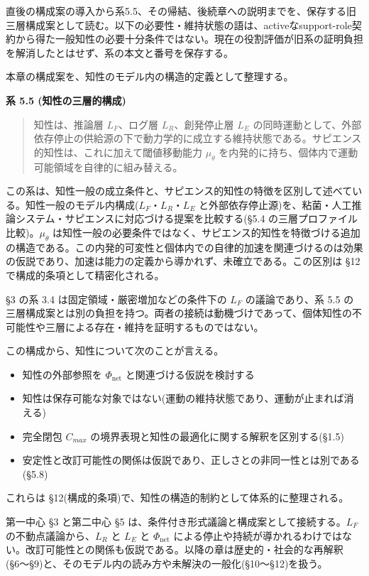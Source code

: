 直後の構成案の導入から系5.5、その帰結、後続章への説明までを、保存する旧三層構成案として読む。以下の必要性・維持状態の語は、activeなsupport-role契約から得た一般知性の必要十分条件ではない。現在の役割評価が旧系の証明負担を解消したとはせず、系の本文と番号を保存する。

本章の構成案を、知性のモデル内の構造的定義として整理する。

\textbf{系 5.5 (知性の三層的構成)}

\begin{quote}
知性は、推論層 $L_F$、ログ層 $L_R$、創発停止層 $L_E$ の同時運動として、外部依存停止の供給源の下で動力学的に成立する維持状態である。サピエンス的知性は、これに加えて閾値移動能力 $\mu_\theta$ を内発的に持ち、個体内で運動可能領域を自律的に組み替える。
\end{quote}


この系は、知性一般の成立条件と、サピエンス的知性の特徴を区別して述べている。知性一般のモデル内構成($L_F$・$L_R$・$L_E$ と外部依存停止源)を、粘菌・人工推論システム・サピエンスに対応づける提案を比較する(\S{}5.4 の三層プロファイル比較)。$\mu_\theta$ は知性一般の必要条件ではなく、サピエンス的知性を特徴づける追加の構造である。この内発的可変性と個体内での自律的加速を関連づけるのは効果の仮説であり、加速は能力の定義から導かれず、未確立である。この区別は \S{}12 で構成的条項として精密化される。

\S{}3 の系 3.4 は固定領域・厳密増加などの条件下の $L_F$ の議論であり、系 5.5 の三層構成案とは別の負担を持つ。両者の接続は動機づけであって、個体知性の不可能性や三層による存在・維持を証明するものではない。

この構成から、知性について次のことが言える。

\begin{itemize}
\item 知性の外部参照を $\Phi_{\text{net}}$ と関連づける仮説を検討する
\item 知性は保存可能な対象ではない(運動の維持状態であり、運動が止まれば消える)
\item 完全閉包 $C_{max}$ の境界表現と知性の最適化に関する解釈を区別する(\S{}1.5)
\item 安定性と改訂可能性の関係は仮説であり、正しさとの非同一性とは別である(\S{}5.8)
\end{itemize}


これらは \S{}12(構成的条項)で、知性の構造的制約として体系的に整理される。

第一中心 \S{}3 と第二中心 \S{}5 は、条件付き形式議論と構成案として接続する。$L_F$ の不動点議論から、$L_R$ と $L_E$ と $\Phi_{\text{net}}$ による停止や持続が導かれるわけではない。改訂可能性との関係も仮説である。以降の章は歴史的・社会的な再解釈(\S{}6〜\S{}9)と、そのモデル内の読み方や未解決の一般化(\S{}10〜\S{}12)を扱う。

